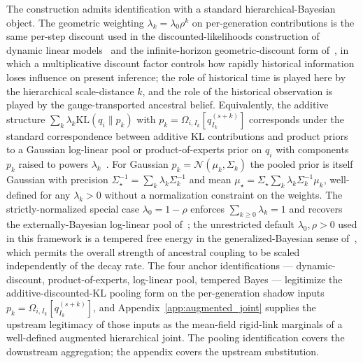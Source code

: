 \documentclass[11pt]{article}
\begin{document}
The construction admits identification with a standard hierarchical-Bayesian object. The geometric weighting $\lambda_k = \lambda_0\rho^k$ on per-generation contributions is the same per-step discount used in the discounted-likelihoods construction of dynamic linear models~\cite[\S 10.7]{WestHarrison1997} and the infinite-horizon geometric-discount form of~\cite{Smith1979}, in which a multiplicative discount factor controls how rapidly historical information loses influence on present inference; the role of historical time is played here by the hierarchical scale-distance $k$, and the role of the historical observation is played by the gauge-transported ancestral belief. Equivalently, the additive structure $\sum_k \lambda_k \mathrm{KL}(q_i \| p_k)$ with $p_k = \Omega_{i,I_k}[q_{I_k}^{(s+k)}]$ corresponds under the standard correspondence between additive KL contributions and product priors~\cite{Friston2010, blei2017variational} to a Gaussian log-linear pool or product-of-experts prior on $q_i$ with components $p_k$ raised to powers $\lambda_k$~\cite{GenestZidek1986, HintonPoE2002}. For Gaussian $p_k = \mathcal{N}(\mu_k, \Sigma_k)$ the pooled prior is itself Gaussian with precision $\Sigma_\star^{-1} = \sum_k \lambda_k \Sigma_k^{-1}$ and mean $\mu_\star = \Sigma_\star \sum_k \lambda_k \Sigma_k^{-1}\mu_k$, well-defined for any $\lambda_k > 0$ without a normalization constraint on the weights. The strictly-normalized special case $\lambda_0 = 1 - \rho$ enforces $\sum_{k \ge 0}\lambda_k = 1$ and recovers the externally-Bayesian log-linear pool of~\cite{GenestZidek1986}; the unrestricted default $\lambda_0, \rho > 0$ used in this framework is a tempered free energy in the generalized-Bayesian sense of~\cite{BissiriHolmesWalker2016}, which permits the overall strength of ancestral coupling to be scaled independently of the decay rate. The four anchor identifications — \cite{WestHarrison1997} dynamic-discount, \cite{HintonPoE2002} product-of-experts, \cite{GenestZidek1986} log-linear pool, \cite{BissiriHolmesWalker2016} tempered Bayes — legitimize the additive-discounted-KL pooling form on the per-generation shadow inputs $p_k = \Omega_{i,I_k}[q_{I_k}^{(s+k)}]$, and Appendix~\ref{app:augmented_joint} supplies the upstream legitimacy of those inputs as the mean-field rigid-link marginals of a well-defined augmented hierarchical joint. The pooling identification covers the downstream aggregation; the appendix covers the upstream substitution.
\end{document}
